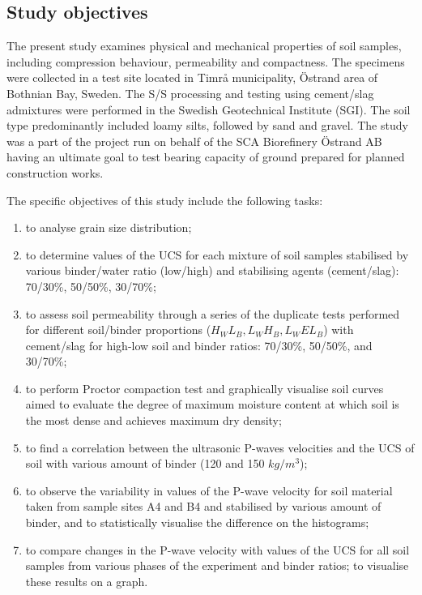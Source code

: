 \documentclass{amestyle}
\begin{document}
\newpage
\subsection{Study objectives} 
The present study examines physical and mechanical properties of soil samples, including compression behaviour, permeability and compactness. The specimens were collected in a test site located in Timrå municipality, Östrand area of Bothnian Bay, Sweden. The S/S processing and testing using cement/slag admixtures were performed in the Swedish Geotechnical Institute (SGI). The soil type predominantly included loamy silts, followed by sand and gravel. The study was a part of the project run on behalf of the SCA Biorefinery Östrand AB having an ultimate goal to test bearing capacity of ground prepared for planned construction works. 

The specific objectives of this study include the following tasks: 

\begin{enumerate}
   \item to analyse grain size distribution;
   \item to determine values of the UCS for each mixture of soil samples stabilised by various binder/water ratio (low/high) and stabilising agents (cement/slag): 70/30\%, 50/50\%, 30/70\%; 
  \item to assess soil permeability through a series of the duplicate tests performed for different soil/binder proportions ($H_WL_B,L_WH_B,L_WEL_B$) with cement/slag for high-low soil and binder ratios: 70/30\%, 50/50\%, and 30/70\%;
  \item to perform Proctor compaction test and graphically visualise soil curves aimed to evaluate the degree of maximum moisture content at which soil is the most dense and achieves maximum dry density;
  \item to find a correlation between the ultrasonic P-waves velocities and the UCS of soil with various amount of binder (120 and 150 $kg/m^3$);
  \item to observe the variability in values of the P-wave velocity for soil material taken from sample sites A4 and B4 and stabilised by various amount of binder, and to statistically visualise the difference on the histograms;
  \item to compare changes in the P-wave velocity with values of the UCS for all soil samples from various phases of the experiment and binder ratios; to visualise these results on a graph.
\end{enumerate}
\end{document}
